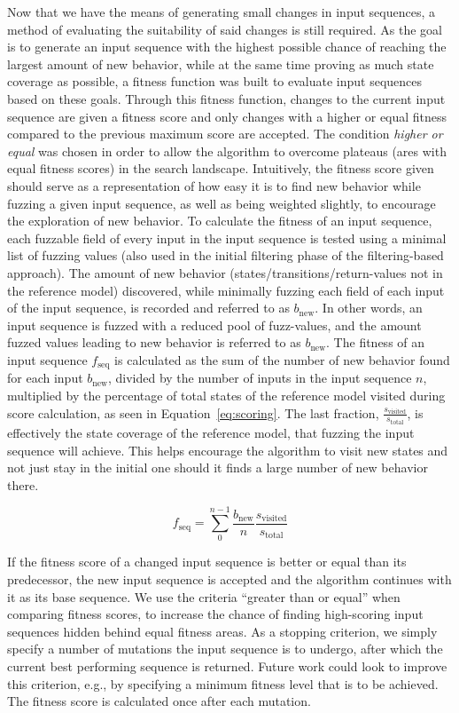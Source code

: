 Now that we have the means of generating small changes in input sequences, a method of evaluating the suitability of said changes is still required. As the goal is to generate an input sequence with the highest possible chance of reaching the largest amount of new behavior, while at the same time proving as much state coverage as possible, a fitness function was built to evaluate input sequences based on these goals. Through this fitness function, changes to the current input sequence are given a fitness score and only changes with a higher or equal fitness compared to the previous maximum score are accepted. The condition \emph{higher or equal} was chosen in order to allow the algorithm to overcome plateaus (ares with equal fitness scores) in the search landscape. Intuitively, the fitness score given should serve as a representation of how easy it is to find new behavior while fuzzing a given input sequence, as well as being weighted slightly, to encourage the exploration of new behavior. To calculate the fitness of an input sequence, each fuzzable field of every input in the input sequence is tested using a minimal list of fuzzing values (also used in the initial filtering phase of the filtering-based approach). The amount of new behavior (states/transitions/return-values not in the reference model) discovered, while minimally fuzzing each field of each input of the input sequence, is recorded and referred to as $b_\mathrm{new}$. In other words, an input sequence is fuzzed with a reduced pool of fuzz-values, and the amount fuzzed values leading to new behavior is referred to as $b_\mathrm{new}$. The fitness of an input sequence $f_\mathrm{seq}$ is calculated as the sum of the number of new behavior found for each input $b_\mathrm{new}$, divided by the number of inputs in the input sequence $n$, multiplied by the percentage of total states of the reference model visited during score calculation, as seen in Equation~\ref{eq:scoring}. The last fraction, $\frac{s_\mathrm{visited}}{s_\mathrm{total}}$, is effectively the state coverage of the reference model, that fuzzing the input sequence will achieve. This helps encourage the algorithm to visit new states and not just stay in the initial one should it finds a large number of new behavior there.

\begin{equation}f_\mathrm{seq} = \sum_{0}^{n-1} \frac{b_\mathrm{new}}{n} \frac{s_\mathrm{visited}}{s_\mathrm{total}} \end{equation} \label{eq:scoring}

If the fitness score of a changed input sequence is better or equal than its predecessor, the new input sequence is accepted and the algorithm continues with it as its base sequence. We use the criteria ``greater than or equal'' when comparing fitness scores, to increase the chance of finding high-scoring input sequences hidden behind equal fitness areas. As a stopping criterion, we simply specify a number of mutations the input sequence is to undergo, after which the current best performing sequence is returned. Future work could look to improve this criterion, e.g., by specifying a minimum fitness level that is to be achieved. The fitness score is calculated once after each mutation.

